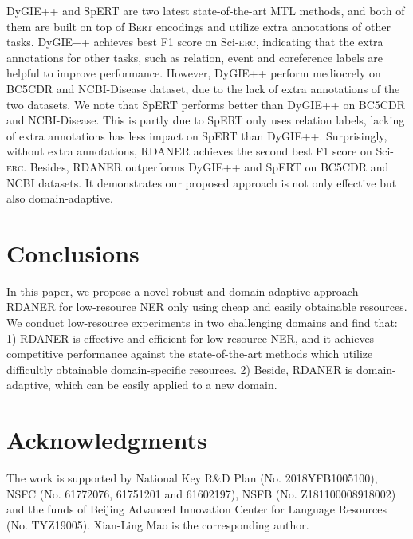 \documentclass[10pt, conference, compsocconf]{IEEEtran}
\newcommand{\bert}{\textsc{Bert}\xspace}
\newcommand{\Scierc}{\textsc{S}ci-\textsc{erc}\xspace}
\newcommand{\rdaner}{\textsc{RDANER}\xspace}
\begin{document}
DyGIE++ and SpERT are two latest state-of-the-art MTL methods,
and both of them are built on top of \bert encodings and utilize extra annotations of other tasks. 
DyGIE++ achieves best F1 score on \Scierc, indicating 
that the extra annotations for other tasks, such as relation, event and coreference labels
are helpful to improve performance. 
However, DyGIE++ perform mediocrely on BC5CDR and 
NCBI-Disease dataset, due to the lack of extra annotations of the two datasets.
We note that SpERT performs better than DyGIE++ on BC5CDR and NCBI-Disease.
This is partly due to SpERT only uses relation labels, lacking of extra annotations has
less impact on SpERT than DyGIE++. 
Surprisingly, without extra annotations, \rdaner achieves the second best F1 score on \Scierc.
Besides, \rdaner outperforms DyGIE++ and SpERT on BC5CDR and NCBI datasets.
It demonstrates our proposed approach is not only effective but also domain-adaptive.




\section{Conclusions}
In this paper, we propose a novel robust and domain-adaptive approach \rdaner for low-resource
NER only using cheap and easily obtainable resources. 
We conduct low-resource experiments in two challenging domains and find that:
1) \rdaner is effective and efficient for low-resource NER, 
and it achieves competitive performance against the state-of-the-art methods which utilize
difficultly obtainable domain-specific resources.
2) Beside, \rdaner is domain-adaptive,  which can be easily applied to a new domain.


\section*{Acknowledgments}
The work is supported by National Key R\&D Plan (No. 2018YFB1005100), 
NSFC (No. 61772076, 61751201 and 61602197), NSFB (No. Z181100008918002) 
and the funds of Beijing Advanced Innovation Center for Language Resources (No. TYZ19005).
Xian-Ling Mao is the corresponding author.



\end{document}
